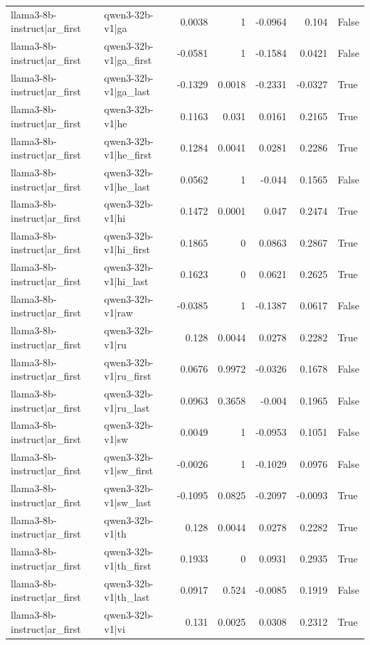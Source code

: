 \begin{table}
\begin{tabular}{l l r r r r l}
llama3-8b-instruct|ar_first & qwen3-32b-v1|ga & 0.0038 & 1 & -0.0964 & 0.104 & False \\
llama3-8b-instruct|ar_first & qwen3-32b-v1|ga_first & -0.0581 & 1 & -0.1584 & 0.0421 & False \\
llama3-8b-instruct|ar_first & qwen3-32b-v1|ga_last & -0.1329 & 0.0018 & -0.2331 & -0.0327 & True \\
llama3-8b-instruct|ar_first & qwen3-32b-v1|he & 0.1163 & 0.031 & 0.0161 & 0.2165 & True \\
llama3-8b-instruct|ar_first & qwen3-32b-v1|he_first & 0.1284 & 0.0041 & 0.0281 & 0.2286 & True \\
llama3-8b-instruct|ar_first & qwen3-32b-v1|he_last & 0.0562 & 1 & -0.044 & 0.1565 & False \\
llama3-8b-instruct|ar_first & qwen3-32b-v1|hi & 0.1472 & 0.0001 & 0.047 & 0.2474 & True \\
llama3-8b-instruct|ar_first & qwen3-32b-v1|hi_first & 0.1865 & 0 & 0.0863 & 0.2867 & True \\
llama3-8b-instruct|ar_first & qwen3-32b-v1|hi_last & 0.1623 & 0 & 0.0621 & 0.2625 & True \\
llama3-8b-instruct|ar_first & qwen3-32b-v1|raw & -0.0385 & 1 & -0.1387 & 0.0617 & False \\
llama3-8b-instruct|ar_first & qwen3-32b-v1|ru & 0.128 & 0.0044 & 0.0278 & 0.2282 & True \\
llama3-8b-instruct|ar_first & qwen3-32b-v1|ru_first & 0.0676 & 0.9972 & -0.0326 & 0.1678 & False \\
llama3-8b-instruct|ar_first & qwen3-32b-v1|ru_last & 0.0963 & 0.3658 & -0.004 & 0.1965 & False \\
llama3-8b-instruct|ar_first & qwen3-32b-v1|sw & 0.0049 & 1 & -0.0953 & 0.1051 & False \\
llama3-8b-instruct|ar_first & qwen3-32b-v1|sw_first & -0.0026 & 1 & -0.1029 & 0.0976 & False \\
llama3-8b-instruct|ar_first & qwen3-32b-v1|sw_last & -0.1095 & 0.0825 & -0.2097 & -0.0093 & True \\
llama3-8b-instruct|ar_first & qwen3-32b-v1|th & 0.128 & 0.0044 & 0.0278 & 0.2282 & True \\
llama3-8b-instruct|ar_first & qwen3-32b-v1|th_first & 0.1933 & 0 & 0.0931 & 0.2935 & True \\
llama3-8b-instruct|ar_first & qwen3-32b-v1|th_last & 0.0917 & 0.524 & -0.0085 & 0.1919 & False \\
llama3-8b-instruct|ar_first & qwen3-32b-v1|vi & 0.131 & 0.0025 & 0.0308 & 0.2312 & True \\

\end{tabular}
\end{table}
